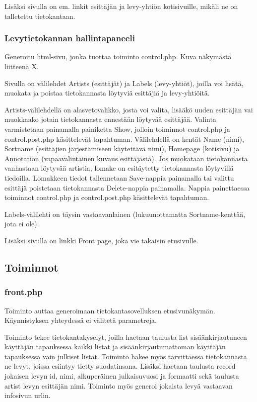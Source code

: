 \documentclass[a4paper,12pt]{report}
\begin{document}
Lisäksi sivulla on em. linkit esittäjän ja levy-yhtiön kotisivuille, mikäli
ne on talletettu tietokantaan.

\subsubsection{Levytietokannan hallintapaneeli}

Generoitu html-sivu, jonka tuottaa toiminto control.php. Kuva näkymästä
liitteenä X.

Sivulla on välilehdet Artists (esittäjät) ja Labels (levy-yhtiöt), joilla
voi lisätä, muokata ja poistaa tietokannasta löytyviä esittäjiä ja
levy-yhtiöitä.

Artists-välilehdellä on alasvetovalikko, josta voi valita, lisääkö uuden
esittäjän vai muokkaako jotain tietokannasta ennestään löytyvää esittäjää.
Valinta varmistetaan painamalla painiketta Show, jolloin toiminnot
control.php ja control.post.php käsittelevät tapahtuman.  Välilehdellä on
kentät Name (nimi), Sortname (esittäjien järjestämiseen käytettävä nimi),
Homepage (kotisivu) ja Annotation (vapaavalintainen kuvaus esittäjästä). Jos
muokataan tietokannasta vanhastaan löytyvää artistia, lomake on esitäytetty
tietokannasta löytyvillä tiedoilla.  Lomakkeen tiedot tallennetaan
Save-nappia painamalla tai valittu esittäjä poistetaan tietokannasta
Delete-nappia painamalla.  Nappia painettaessa toiminnot control.php ja
control.post.php käsittelevät tapahtuman.

Labels-välilehti on täysin vastaavanlainen (lukuunottamatta
Sortname-kenttää, jota ei ole).

Lisäksi sivulla on linkki Front page, joka vie takaisin etusivulle.

\subsection{Toiminnot}

\subsubsection{front.php}

Toiminto auttaa generoimaan tietokantasovelluksen etusivunäkymän.
Käynnistyksen yhteydessä ei välitetä parametreja.

Toiminto tekee tietokantakyselyt, joilla haetaan taulusta list
sisäänkirjautuneen käyttäjän tapauksessa kaikki listat ja
sisäänkirjautumattoman käyttäjän tapauksessa vain julkiset listat.  Toiminto
hakee myös tarvittaessa tietokannasta ne levyt, joissa esiintyy tietty
suodatinsana.  Lisäksi haetaan taulusta record jokaisen levyn id, nimi,
alkuperäinen julkaisuvuosi ja formaatti sekä taulusta artist levyn esittäjän
nimi. Toiminto myös generoi jokaista levyä vastaavan infosivun urlin.
\end{document}
